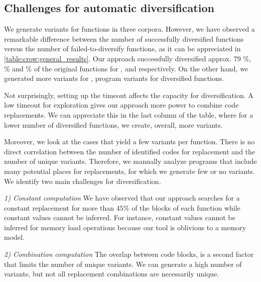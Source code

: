 \subsection*{Challenges for automatic diversification}



We generate variants for functions in three corpora. However, we have observed a remarkable difference between the number of successfully diversified functions versus the number of failed-to-diversify functions, as it can be appreciated in \autoref{table:crow:general_results}. Our approach successfully diversified approx. 79 \%, \% and \% of the original functions for \corpusrosetta, \corpussodium and \corpusqrcode respectively. On the other hand, we generated more variants for \corpusqrcode, \py{\qrpopulation} program variants for \py{\diversifiedqrcode} diversified functions. 

Not surprisingly, setting up the timeout affects the capacity for diversification. A low timeout for exploration gives our approach more power to combine code replacements. We can appreciate this in the last column of the table, where for a lower number of diversified functions, we create, overall, more variants.

Moreover, we look at the cases that yield a few variants per function. There is no direct correlation between the number of identified codes for replacement and the number of unique variants. Therefore, we manually analyze programs that include many potential places for replacements, for which we generate few or no variants. 
We identify two main challenges for diversification.

\emph{1) Constant computation}  We have observed that our approach searches for a constant replacement for more than $45\%$ of the blocks of each function while constant values cannot be inferred. For instance,  constant values cannot be inferred for memory load operations because our tool is oblivious to a memory model. 


\emph{2) Combination computation}  The overlap between code blocks, is a second factor that limits the number of unique variants. We can generate a high number of variants, but not all replacement combinations are necessarily unique.



